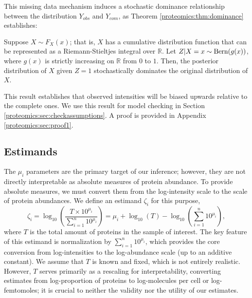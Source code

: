 This missing data mechanism induces a stochastic dominance relationship between the distribution $Y_{obs}$ and $Y_{com}$, as Theorem \ref{proteomics:thm:dominance} establishes:
%
\begin{theorem}\label{proteomics:thm:dominance}
Suppose $X \sim F_X(x)$; that is, $X$ has a cumulative distribution function that can be represented as a Riemann-Stieltjes integral over $\mathbb{R}$. Let $Z | X=x \sim \operatorname{Bern}( g(x) )$, where $g(x)$ is strictly increasing on $\mathbb{R}$ from $0$ to $1$. Then, the posterior distribution of $X$ given $Z=1$ stochastically dominates the original distribution of $X$.
\end{theorem}
%
This result establishes that observed intensities will be biased upwards relative to the complete ones.
We use this result for model checking in Section \ref{proteomics:sec:checkassumptions}. A proof is provided in Appendix \ref{proteomics:sec:proof1}.



\subsection{Estimands}
\label{proteomics:sec:estimand}

The $\mu_i$ parameters are the primary target of our inference; however, they are not directly interpretable as absolute measures of protein abundance.
To provide absolute measures, we must convert them from the log-intensity scale to the scale of protein abundances.
We define an estimand $\zeta_i$ for this purpose, 
%
\begin{equation}
\zeta_i = \log_{10} \left( \frac{T \times 10^{\mu_i}}{ \sum_{i=1}^{n} 10^{\mu_i}} \right) = \mu_i + \log_{10}(T) - \log_{10}\left(\sum_{i=1}^{n} 10^{\mu_i}\right), \label{proteomics:eq:abs_abund_estimand} 
\end{equation}
%
where $T$ is the total amount of proteins in the sample of interest.
The key feature of this estimand is normalization by $\sum_{i=1}^n 10^{\mu_i}$, which provides the core conversion from log-intensities to the log-abundance scale (up to an additive constant).
We assume that $T$ is known and fixed, which is not entirely realistic.
However, $T$ serves primarily as a rescaling for interpretability, converting estimates from log-proportion of proteins to log-molecules per cell or log-femtomoles; it is crucial to neither the validity nor the utility of our estimates.



